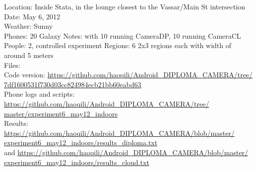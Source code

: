 Location: Inside Stata, in the lounge closest to the Vassar/Main St intersection\\
Date: May 6, 2012\\
Weather: Sunny\\
Phones: 20 Galaxy Notes: with 10 running CameraDP, 10 running CameraCL\\
People: 2, controlled experiment
Regions: 6 2x3 regions each with width of around 5 meters\\
Files:\\
Code version: {\url{https://github.com/haoqili/Android_DIPLOMA_CAMERA/tree/}}\\
{\url{7df1600531f730d03cc824984ecb21bb60eabd63}}\\
Phone logs and scripts: {\url{https://github.com/haoqili/Android_DIPLOMA_CAMERA/tree/}}\\
{\url{master/experiment6_may12_indoors}}\\ 
Results: {\url{https://github.com/haoqili/Android_DIPLOMA_CAMERA/blob/master/}}\\
{\url{experiment6_may12_indoors/results_diploma.txt}}\\
and {\url{https://github.com/haoqili/Android_DIPLOMA_CAMERA/blob/master/}}\\
{\url{experiment6_may12_indoors/results_cloud.txt}}

